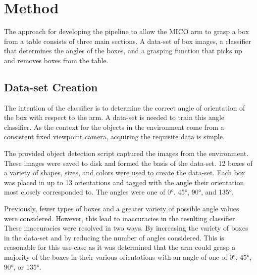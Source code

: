 \documentclass[letterpaper, 10 pt, conference]{conf/ieeeconf}  %
\begin{document}
\section{Method}
\label{sec:method}


The approach for developing the pipeline to allow the MICO arm to grasp a box
from a table consists of three main sections. A data-set of box images, a
classifier that determines the angles of the boxes, and a grasping function that
picks up and removes boxes from the table.

\subsection{Data-set Creation} %

The intention of the classifier is to determine the correct angle of orientation
of the box with respect to the arm. A data-set is needed to train this angle
classifier. As the context for the objects in the environment come from a
consistent fixed viewpoint camera, acquiring the requisite data is simple.

The provided object detection script captured the images from the environment.
These images were saved to disk and formed the basis of the data-set. 12 boxes
of a variety of shapes, sizes, and colors were used to create the data-set. Each
box was placed in up to 13 orientations and tagged with the angle their
orientation most closely corresponded to. The angles were one of \ang{0}.
\ang{45}, \ang{90}, and \ang{135}.

Previously, fewer types of boxes and a greater variety of possible angle values
were considered. However, this lead to inaccuracies in the resulting classifier.
These inaccuracies were resolved in two ways. By increasing the variety of boxes
in the data-set and by reducing the number of angles considered. This is
reasonable for this use-case as it was determined that the arm could grasp a
majority of the boxes in their various orientations with an angle of one of
\ang{0}, \ang{45}, \ang{90}, or \ang{135}.
\end{document}
